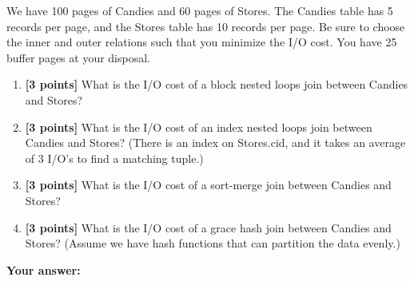 \documentclass[10pt]{article}
\begin{document}
\noindent
We have 100 pages of Candies and 60 pages of Stores. The Candies table has 5 records per
page, and the Stores table has 10 records per page. Be sure to choose the inner and outer relations such that you minimize the I/O cost. You have 25 buffer pages at your disposal.


\begin{enumerate}
	\item \textbf{[3 points]}
	      What is the I/O cost of a block nested loops join between Candies and Stores? \\
	\item \textbf{[3 points]}
	      What is the I/O cost of an index nested loops join between Candies and Stores?
	      (There is an index on Stores.cid, and it takes an average of 3 I/O's to find a matching tuple.) \\
	\item \textbf{[3 points]}
	      What is the I/O cost of a sort-merge join between Candies and Stores? \\
	\item \textbf{[3 points]}
	      What is the I/O cost of a grace hash join between Candies and Stores?
	      (Assume we have hash functions that can partition the data evenly.)
\end{enumerate}
\textbf{Your answer:}




\newpage
\end{document}
